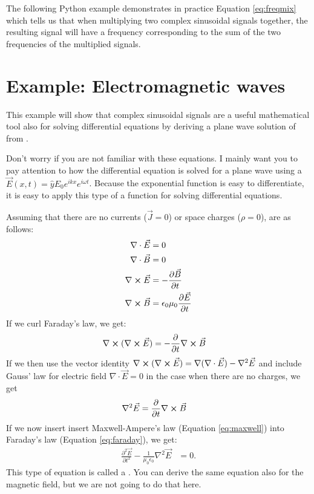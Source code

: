 The following Python example demonstrates in practice
Equation \ref{eq:freqmix} which tells us that when multiplying two complex sinusoidal signals together, the resulting signal will have a frequency corresponding to the sum of the two frequencies of the multiplied signals.



\section{Example: Electromagnetic waves}
\label{waveeq}

This example will show that complex sinusoidal signals are a useful mathematical tool also for solving differential equations by deriving a plane wave solution of  from .

Don't worry if you are not familiar with these equations. I mainly want you to pay attention to how the differential equation is solved for a plane wave using a  $\vec{E}(x,t)=\hat{y}E_0 e^{i k x}e^{i\omega t}$. Because the exponential function is easy to differentiate, it is easy to apply this type of a function for solving differential equations.

Assuming that there are no currents ($\vec{J}=0$) or space charges ($\rho=0$),  are as follows:
\begin{align}
\nabla \cdot \vec{E} &= 0 \\
\nabla \cdot \vec{B} &= 0 \\
\nabla \cross \vec{E} &= -\frac{\partial \vec{B}}{\partial t} \label{eq:faraday}\\
\nabla \cross \vec{B} &= \epsilon_0 \mu_0 \frac{\partial \vec{E}}{\partial t} \label{eq:maxwell}
\end{align}
If we curl Faraday's law, we get:
\begin{align}
\nabla \cross (\nabla \cross \vec{E}) &= -\frac{\partial }{\partial t}\nabla \cross \vec{B}
\end{align}
If we then use the vector identity
$\nabla \cross (\nabla \cross \vec{E}) = \nabla(\nabla \cdot \vec{E}) - \nabla^2 \vec{E}$ and include Gauss' law for electric field $\nabla \cdot \vec{E} = 0$ in the case when there are no charges, we get
\begin{align}
\nabla^2 \vec{E} &= \frac{\partial }{\partial t}\nabla \cross \vec{B}
\end{align}
If we now insert insert Maxwell-Ampere's law (Equation \ref{eq:maxwell}) into Faraday's
law (Equation \ref{eq:faraday}), we get:
\begin{align}
\frac{\partial^2 \vec{E}}{\partial t^2} - \frac{1}{\mu_0 \epsilon_0} \nabla^2 \vec{E} &= 0.
\end{align}
This type of equation is called a . You can derive the same equation also for the magnetic field, but we are not going to do that here.


